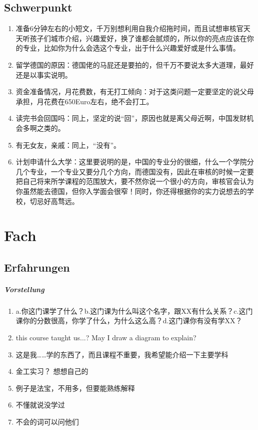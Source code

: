 \documentclass[b5paper, twoside]{ctexbook}
\begin{document}
\section{Schwerpunkt}
\begin{enumerate}
  \item 准备6分钟左右的小短文，千万别想利用自我介绍拖时间，而且试想审核官天天听孩子们城市介绍，兴趣爱好，换了谁都会腻烦的，所以你的亮点应该在你的专业，比如你为什么会选这个专业，出于什么兴趣爱好或是什么事情。
  \item 留学德国的原因：德国佬的马屁还是要拍的，但千万不要说太多大道理，最好还是以事实说明。
  \item 资金准备情况，月花费数，有无打工倾向：对于这类问题一定要坚定的说父母承担，月花费在650Euro左右，绝不会打工。
  \item 读完书会回国吗：同上，坚定的说“回”，原因也就是离父母近啊，中国发财机会多啊之类的。
  \item 有无女友，亲戚：同上，“没有”。
  \item 计划申请什么大学：这里要说明的是，中国的专业分的很细，什么一个学院分几个专业，一个专业又要分几个方向，而德国没有，因此在审核的时候一定要把自己将来所学课程的范围放大，要不然你说一个很小的方向，审核官会认为你虽然能去德国，但你入学面会很窄！同时，你还得根据你的实力说想去的学校，切忌好高骛远。
\end{enumerate}
\chapter{Fach}
\section{Erfahrungen}
\paragraph{Vorstellung}
\begin{enumerate}
  \item a.你这门课学了什么？b.这门课为什么叫这个名字，跟XX有什么关系？c.这门课你的分数很高，你学了什么，为什么这么高？d.这门课你有没有学XX？
  \item this course taught us...? May I draw a diagram to explain?
  \item 这是我……学的东西了，而且课程不重要，我希望能介绍一下主要学科
  \item 金工实习？ 想想自己的
  \item 例子是法宝，不用多，但要能熟练解释
  \item 不懂就说没学过
  \item 不会的词可以问他们
\end{enumerate}
\end{document}
